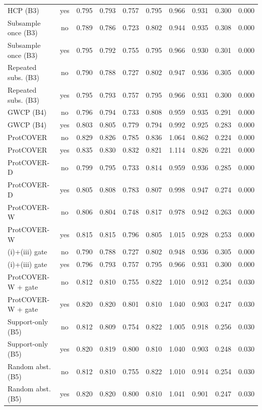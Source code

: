 \begin{longtable}{lccccccccc}
HCP (B3) & yes & 0.795 & 0.793 & 0.757 & 0.795 & 0.966 & 0.931 & 0.300 & 0.000 \\
Subsample once (B3) & no & 0.789 & 0.786 & 0.723 & 0.802 & 0.944 & 0.935 & 0.308 & 0.000 \\
Subsample once (B3) & yes & 0.795 & 0.792 & 0.755 & 0.795 & 0.966 & 0.930 & 0.301 & 0.000 \\
Repeated subs. (B3) & no & 0.790 & 0.788 & 0.727 & 0.802 & 0.947 & 0.936 & 0.305 & 0.000 \\
Repeated subs. (B3) & yes & 0.795 & 0.793 & 0.757 & 0.795 & 0.966 & 0.931 & 0.300 & 0.000 \\
GWCP (B4) & no & 0.796 & 0.794 & 0.733 & 0.808 & 0.959 & 0.935 & 0.291 & 0.000 \\
GWCP (B4) & yes & 0.803 & 0.805 & 0.779 & 0.794 & 0.992 & 0.925 & 0.283 & 0.000 \\
ProtCOVER & no & 0.829 & 0.826 & 0.785 & 0.836 & 1.064 & 0.862 & 0.224 & 0.000 \\
ProtCOVER & yes & 0.835 & 0.830 & 0.832 & 0.821 & 1.114 & 0.826 & 0.221 & 0.000 \\
ProtCOVER-D & no & 0.799 & 0.795 & 0.733 & 0.814 & 0.959 & 0.936 & 0.285 & 0.000 \\
ProtCOVER-D & yes & 0.805 & 0.808 & 0.783 & 0.807 & 0.998 & 0.947 & 0.274 & 0.000 \\
ProtCOVER-W & no & 0.806 & 0.804 & 0.748 & 0.817 & 0.978 & 0.942 & 0.263 & 0.000 \\
ProtCOVER-W & yes & 0.815 & 0.815 & 0.796 & 0.805 & 1.015 & 0.928 & 0.253 & 0.000 \\
(i)+(iii) gate & no & 0.790 & 0.788 & 0.727 & 0.802 & 0.948 & 0.936 & 0.305 & 0.000 \\
(i)+(iii) gate & yes & 0.796 & 0.793 & 0.757 & 0.795 & 0.966 & 0.931 & 0.300 & 0.000 \\
ProtCOVER-W + gate & no & 0.812 & 0.810 & 0.755 & 0.822 & 1.010 & 0.912 & 0.254 & 0.030 \\
ProtCOVER-W + gate & yes & 0.820 & 0.820 & 0.801 & 0.810 & 1.040 & 0.903 & 0.247 & 0.030 \\
Support-only (B5) & no & 0.812 & 0.809 & 0.754 & 0.822 & 1.005 & 0.918 & 0.256 & 0.030 \\
Support-only (B5) & yes & 0.820 & 0.819 & 0.800 & 0.810 & 1.040 & 0.903 & 0.248 & 0.030 \\
Random abst. (B5) & no & 0.812 & 0.810 & 0.755 & 0.822 & 1.010 & 0.914 & 0.254 & 0.030 \\
Random abst. (B5) & yes & 0.820 & 0.820 & 0.800 & 0.810 & 1.041 & 0.901 & 0.247 & 0.030 \\

\end{longtable}
